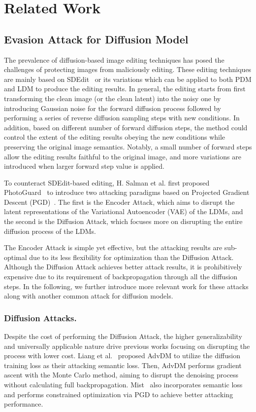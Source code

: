 \section{Related Work}


\subsection{Evasion Attack for Diffusion Model}
The prevalence of diffusion-based image editing techniques has posed the challenges of protecting images from maliciously editing.
These editing techniques are mainly based on SDEdit~\cite{meng2021sdedit} or its variations which can be applied to both PDM and LDM to produce the editing results. In general, the editing starts from first transforming the clean image (or the clean latent) into the noisy one by introducing Gaussian noise for the forward diffusion process followed by performing a series of reverse diffusion sampling steps with new conditions. In addition, based on different number of forward diffusion steps, the method could control the extent of the editing results obeying the new conditions while preserving the original image semantics. Notably, a small number of forward steps allow the editing results faithful to the original image, and more variations are introduced when larger forward step value is applied.

To counteract SDEdit-based editing, H. Salman et al. first proposed PhotoGuard~\cite{salman2023raisingcostmaliciousaipowered} to introduce two attacking paradigms based on Projected Gradient Descent (PGD)~\cite{madry2018towards}. The first is the Encoder Attack, which aims to disrupt the latent representations of the Variational Autoencoder (VAE) of the LDMs, and the second is the Diffusion Attack, which focuses more on disrupting the entire diffusion process of the LDMs. 

The Encoder Attack is simple yet effective, but the attacking results are sub-optimal due to its less flexibility for optimization than the Diffusion Attack. Although the Diffusion Attack achieves better attack results, it is prohibitively expensive due to its requirement of backpropagation through all the diffusion steps. In the following, we further introduce more relevant work for these attacks along with another common attack for diffusion models.

\subsubsection{Diffusion Attacks.}
Despite the cost of performing the Diffusion Attack, the higher generalizability and universally applicable nature drive previous works focusing on disrupting the process with lower cost. Liang et al.~\cite{liang2023adversarialexampledoesgood} proposed AdvDM to utilize the diffusion training loss as their attacking semantic loss. Then, AdvDM performs gradient ascent with the Monte Carlo method, aiming to disrupt the denoising process without calculating full backpropagation. Mist~\cite{liang2023mistimprovedadversarialexamples} also incorporates semantic loss and performs constrained optimization via PGD to achieve better attacking performance.

